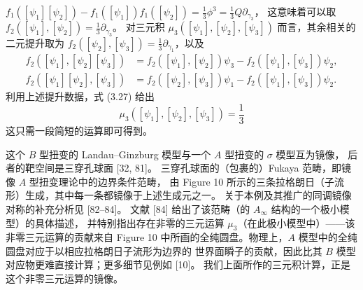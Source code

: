 

$f_1([\psi_1][\psi_2]) - f_1([\psi_1])f_1([\psi_2]) = \frac{1}{3}\phi^3 = \frac{1}{3}Q\partial_{\gamma_3}$，
这意味着可以取 $f_2([\psi_1],[\psi_2]) = \frac{1}{3}\partial_{\gamma_3}$。
对三元积 $\mu_3([\psi_1],[\psi_2],[\psi_3])$ 而言，其余相关的二元提升取为
$f_2([\psi_2],[\psi_3]) = \frac{1}{3}\partial_{\gamma_1}$，以及
\begin{equation}\tag{3.32}
\begin{aligned}
f_2([\psi_1],[\psi_2][\psi_3]) &= f_2([\psi_1],[\psi_2])\psi_3 - f_2([\psi_1],[\psi_3])\psi_2, \\
f_2([\psi_1][\psi_2],[\psi_3]) &= f_2([\psi_2],[\psi_3])\psi_1 - f_2([\psi_1],[\psi_3])\psi_2 .
\end{aligned}
\end{equation}
利用上述提升数据，式 (3.27) 给出
\begin{equation}\tag{3.33}
\mu_3([\psi_1],[\psi_2],[\psi_3]) = \frac{1}{3}
\end{equation}
这只需一段简短的运算即可得到。

这个 $B$ 型扭变的 Landau--Ginzburg 模型与一个 $A$ 型扭变的 $\sigma$ 模型互为镜像，
后者的靶空间是三穿孔球面 [32, 81]。
三穿孔球面的（包裹的）Fukaya 范畴，即镜像 $A$ 型扭变理论中的边界条件范畴，
由 Figure 10 所示的三条拉格朗日（子流形）生成，其中每一条都镜像于上述生成元之一。
关于本例及其推广的同调镜像对称的补充分析见 [82--84]。
文献 [84] 给出了该范畴（的 $A_\infty$ 结构的一个极小模型）的具体描述，
并特别指出存在非零的三元运算 $\mu_3$（在此极小模型中）——该非零三元运算的贡献来自
Figure 10 中所画的全纯圆盘。物理上，$A$ 模型中的全纯圆盘对应于以相应拉格朗日子流形为边界的
世界面瞬子的贡献，因此比其 $B$ 模型对应物更难直接计算；更多细节见例如 [10]。
我们上面所作的三元积计算，正是这个非零三元运算的镜像。

